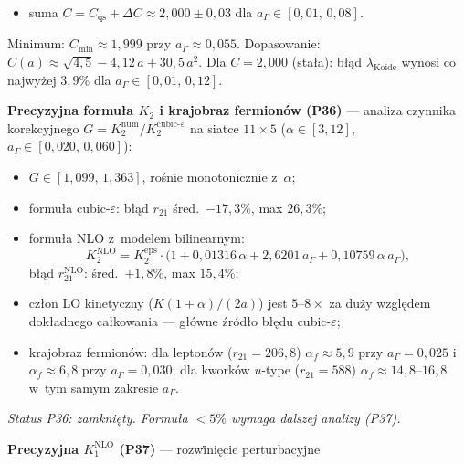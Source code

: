 \begin{problem}
\begin{description}[leftmargin=2em, labelindent=0pt]
\begin{itemize}[nosep]
          $E_\mathrm{kin} + E_\mathrm{cub}$) ro\'snie monotonicznie:
          $\Delta C(0{,}005) = 0{,}031$, $\Delta C(0{,}120) = 0{,}586$;
    \item suma $C = C_\mathrm{qs} + \Delta C \approx 2{,}000 \pm 0{,}03$
          dla $a_\Gamma \in [0{,}01,\, 0{,}08]$.
  \end{itemize}
  Minimum: $C_\mathrm{min} \approx 1{,}999$ przy $a_\Gamma \approx 0{,}055$.
  Dopasowanie: $C(a) \approx \sqrt{4{,}5} - 4{,}12\,a + 30{,}5\,a^2$.
  Dla $C = 2{,}000$ (sta\l{}a): b\l{}\k{a}d $\lambda_\mathrm{Koide}$
  wynosi co najwy\.zej $3{,}9\%$ dla $a_\Gamma \in [0{,}01,\, 0{,}12]$.
  \par
  \textbf{Precyzyjna formu\l{}a $K_2$ i krajobraz fermion\'ow (P36)} ---
  analiza czynnika korekcyjnego $G = K_2^\mathrm{num}/K_2^\mathrm{cubic\text{-}\varepsilon}$
  na siatce $11 \times 5$ ($\alpha \in [3,12]$, $a_\Gamma \in [0{,}020,\,0{,}060]$):
  \begin{itemize}[nosep]
    \item $G \in [1{,}099,\, 1{,}363]$, ro\'snie monotonicznie z~$\alpha$;
    \item formu\l{}a cubic-$\varepsilon$: b\l{}\k{a}d $r_{21}$ \'sred.\ $-17{,}3\%$,
          max $26{,}3\%$;
    \item formu\l{}a NLO z~modelem bilinearnym:
    \begin{equation}\label{eq:K2-NLO}
        K_2^\mathrm{NLO} = K_2^\mathrm{eps}\cdot
        \bigl(1 + 0{,}01316\,\alpha + 2{,}6201\,a_\Gamma
              + 0{,}10759\,\alpha\,a_\Gamma\bigr),
    \end{equation}
    b\l{}\k{a}d $r_{21}^\mathrm{NLO}$: \'sred.\ $+1{,}8\%$, max $15{,}4\%$;
    \item cz\l{}on LO kinetyczny ($K(1{+}\alpha)/(2a)$) jest $5$--$8\times$
          za du\.zy wzgl\k{e}dem dok\l{}adnego ca\l{}kowania --- g\l{}\'owne
          \'zr\'od\l{}o b\l{}\k{e}du cubic-$\varepsilon$;
    \item krajobraz fermion\'ow: dla lepton\'ow ($r_{21}=206{,}8$)
          $\alpha_f \approx 5{,}9$ przy $a_\Gamma=0{,}025$ i $\alpha_f \approx 6{,}8$
          przy $a_\Gamma=0{,}030$; dla kwork\'ow $u$-type ($r_{21}=588$)
          $\alpha_f \approx 14{,}8$--$16{,}8$ w~tym samym zakresie $a_\Gamma$.
  \end{itemize}
  \textit{Status P36: zamkni\k{e}ty. Formu\l{}a $<5\%$ wymaga dalszej analizy (P37).}
  \par
  \textbf{Precyzyjna $K_1^\mathrm{NLO}$ (P37)} --- rozw\.ini\k{e}cie perturbacyjne

\end{description}
\end{problem}
